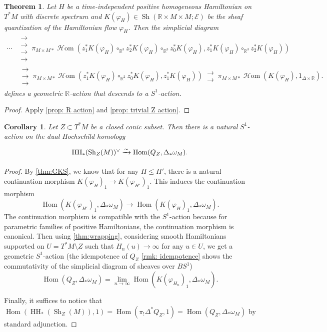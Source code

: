 \documentclass[11pt]{amsart}
\numberwithin{equation}{section}
\theoremstyle{plain}
\newtheorem{Thm}{Theorem}[section]
\newtheorem{Coro}[coro]{Corollary}
\theoremstyle{definition}
\theoremstyle{remark}
\newcommand{\bR} { {\mathbb{R}}}
\newcommand{\cE} { {\mathcal{E}}}
\newcommand{\Sh} { {\operatorname{Sh}}}
\newcommand\HH{\operatorname{HH}}
\newcommand\Hom{\operatorname{Hom}}
\newcommand\sHom{\operatorname{\mathscr{H}om}}
\begin{document}
\begin{Thm}\label{thm:geometric circle action}
Let $H$ be a time-independent positive homogeneous Hamiltonian on $T^*M$ with discrete spectrum and $K(\varphi_H) \in \Sh(\bR \times M \times M; \cE)$ be the sheaf quantization of the Hamiltonian flow $\varphi_H$. Then the simplicial diagram
\begin{align*}
\cdots & \substack{\longrightarrow \\[-0.8em] \longrightarrow \\[-0.8em] \longrightarrow \\[-0.8em] \longrightarrow}\, \pi_{M\times M*}\sHom(z_1^*K(\varphi_H) \circ_{\bR^3} z_2^*K(\varphi_H) \circ_{\bR^3} z_0^*K(\varphi_H), z_1^*K(\varphi_H) \circ_{\bR^3} z_2^*K(\varphi_H)) \\
&\,\substack{\longrightarrow \\[-0.8em] \longrightarrow \\[-0.8em] \longrightarrow}\, \pi_{M\times M*}\sHom(z_1^*K(\varphi_H) \circ_{\bR^2} z_0^*K(\varphi_H), z_1^*K(\varphi_H)) \,\substack{\longrightarrow \\[-0.8em] \longrightarrow}\, \pi_{M\times M*}\sHom(K(\varphi_H), 1_{\Delta\times \bR}).
\end{align*}
defines a geometric $\bR$-action that descends to a $S^1$-action.
\end{Thm}
\begin{proof}Apply \autoref{prop: R action} and \autoref{prop: trivial Z action}.
\end{proof}



\begin{Coro}\label{cor:geometric circle action}
Let $Z \subset T^*M$ be a closed conic subset. Then there is a natural $S^1$-action on the dual Hochschild homology
\[\begin{tikzcd}
\HH_*(\Sh_Z(M))^\vee \xrightarrow{\sim} \Hom(Q_Z, \Delta_*\omega_M).
\end{tikzcd}\]
\end{Coro}
\begin{proof}
By \autoref{thm:GKS}, we know that for any $H \leq H'$, there is a natural continuation morphism $K(\varphi_{H})_1 \to K(\varphi_{H'})_1$. This induces the continuation morphism
\[\Hom(K(\varphi_{H'})_1, \Delta_*\omega_M) \to \Hom(K(\varphi_H)_1, \Delta_*\omega_M).\]
The continuation morphism is compatible with the $S^1$-action because for parametric families of positive Hamiltonians, the continuation morphism is canonical.
Then using \autoref{thm:wrapping}, considering smooth Hamiltonians supported on $U = T^*M \setminus Z$ such that $H_n(u) \to \infty$ for any $u \in U$, we get a geometric $S^1$-action (the idempotence of $Q_Z$ \autoref{rmk: idempotence} shows the commutativity of the simplicial diagram of sheaves over $BS^1$)
\[\Hom(Q_Z, \Delta_*\omega_M) = \lim_{n \to \infty}\Hom(K(\varphi_{H_n})_1, \Delta_*\omega_M).\]

Finally, it suffices to notice that $\Hom(\HH_*(\Sh_Z(M)), 1) = \Hom(\pi_!\Delta^*Q_Z, 1) = \Hom(Q_Z, \Delta_*\omega_M)$ by standard adjunction.
\end{proof}
\end{document}
